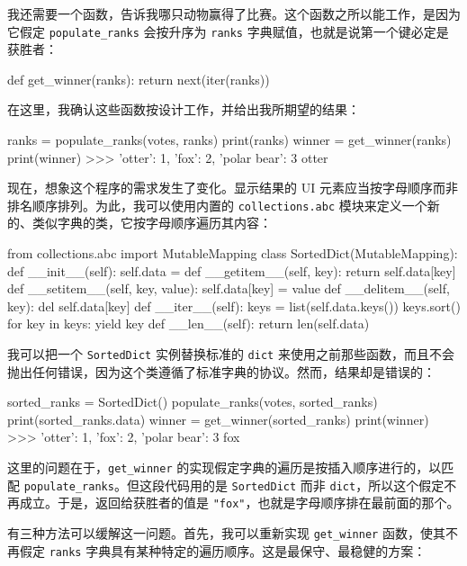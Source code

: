 我还需要一个函数，告诉我哪只动物赢得了比赛。这个函数之所以能工作，是因为它假定 \texttt{populate\_ranks} 会按升序为 \texttt{ranks} 字典赋值，也就是说第一个键必定是获胜者：

\begin{codebox}[python]
def get_winner(ranks):
    return next(iter(ranks))
\end{codebox}

在这里，我确认这些函数按设计工作，并给出我所期望的结果：

\begin{codebox}[python]
ranks = {}
populate_ranks(votes, ranks)
print(ranks)
winner = get_winner(ranks)
print(winner)
>>>
{'otter': 1, 'fox': 2, 'polar bear': 3}
otter
\end{codebox}

现在，想象这个程序的需求发生了变化。显示结果的 UI 元素应当按字母顺序而非排名顺序排列。为此，我可以使用内置的 \texttt{collections.abc} 模块来定义一个新的、类似字典的类，它按字母顺序遍历其内容：

\begin{codebox}[python]
from collections.abc import MutableMapping
class SortedDict(MutableMapping):
    def __init__(self):
        self.data = {}
    def __getitem__(self, key):
        return self.data[key]
    def __setitem__(self, key, value):
        self.data[key] = value
    def __delitem__(self, key):
        del self.data[key]
    def __iter__(self):
        keys = list(self.data.keys())
        keys.sort()
        for key in keys:
            yield key
    def __len__(self):
        return len(self.data)
\end{codebox}

我可以把一个 \texttt{SortedDict} 实例替换标准的 \texttt{dict} 来使用之前那些函数，而且不会抛出任何错误，因为这个类遵循了标准字典的协议。然而，结果却是错误的：

\begin{codebox}[python]
sorted_ranks = SortedDict()
populate_ranks(votes, sorted_ranks)
print(sorted_ranks.data)
winner = get_winner(sorted_ranks)
print(winner)
>>>
{'otter': 1, 'fox': 2, 'polar bear': 3}
fox
\end{codebox}

这里的问题在于，\texttt{get\_winner} 的实现假定字典的遍历是按插入顺序进行的，以匹配 \texttt{populate\_ranks}。但这段代码用的是 \texttt{SortedDict} 而非 \texttt{dict}，所以这个假定不再成立。于是，返回给获胜者的值是 \texttt{"fox"}，也就是字母顺序排在最前面的那个。

有三种方法可以缓解这一问题。首先，我可以重新实现 \texttt{get\_winner} 函数，使其不再假定 \texttt{ranks} 字典具有某种特定的遍历顺序。这是最保守、最稳健的方案：

